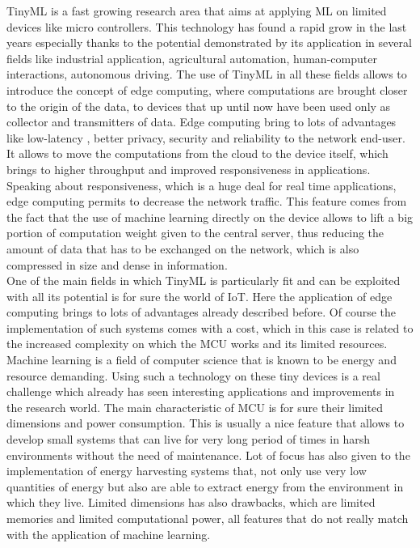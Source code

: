 \documentclass[12pt]{report}
\begin{document}
TinyML is a fast growing research area that aims at applying ML on limited devices like micro controllers. This technology has found a rapid grow in the last years especially thanks to the potential demonstrated by its application in several fields like industrial application, agricultural automation, human-computer interactions, autonomous driving. The use of TinyML in all these fields allows to introduce the concept of edge computing, where computations are brought closer to the origin of the data, to devices that up until now have been used only as collector and transmitters of data. Edge computing bring to lots of advantages like low-latency , better privacy, security and reliability to the network end-user. It allows to move the computations from the cloud to the device itself, which brings to higher throughput and improved responsiveness in applications. Speaking about responsiveness, which is a huge deal for real time applications, edge computing permits to decrease the network traffic. This feature comes from the fact that the use of machine learning directly on the device allows to lift a big portion of computation weight given to the central server, thus reducing the amount of data that has to be exchanged on the network, which is also compressed in size and dense in information. \\
One of the main fields in which TinyML is particularly fit and can be exploited with all its potential is for sure the world of IoT. Here the application of edge computing brings to lots of advantages already described before. Of course the implementation of such systems comes with a cost, which in this case is related to the increased complexity on which the MCU works and its limited resources. Machine learning is a field of computer science that is known to be energy and resource demanding. Using such a technology on these tiny devices is a real challenge which already has seen interesting applications and improvements in the research world. The main characteristic of MCU is for sure their limited dimensions and power consumption. This is usually a nice feature that allows to develop small systems that can live for very long period of times in harsh environments without the need of maintenance. 
Lot of focus has also given to the implementation of energy harvesting systems that, not only use very low quantities of energy but also are able to extract energy from the environment in which they live. Limited dimensions has also drawbacks, which are limited memories and limited computational power, all features that do not really match with the application of machine learning. 
\end{document}
